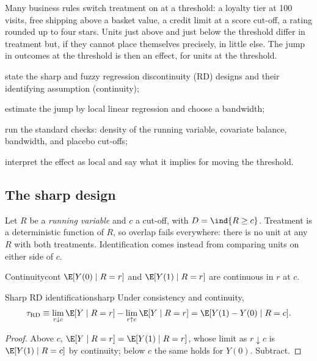 \documentclass[11pt]{article}
\begin{document}

\begin{decision}
Many business rules switch treatment on at a threshold: a loyalty tier at 100 visits, free shipping above a basket value, a
credit limit at a score cut-off, a rating rounded up to four stars. Units just above and just below the threshold differ in
treatment but, if they cannot place themselves precisely, in little else. The jump in outcomes at the threshold is then an
effect, for units at the threshold.
\end{decision}

\begin{goals}
  \item state the sharp and fuzzy regression discontinuity (RD) designs and their identifying assumption (continuity);
  \item estimate the jump by local linear regression and choose a bandwidth;
  \item run the standard checks: density of the running variable, covariate balance, bandwidth, and placebo cut-offs;
  \item interpret the effect as local and say what it implies for moving the threshold.
\end{goals}

\sectionone

\subsection{The sharp design}

Let $R$ be a \emph{running variable} and $c$ a cut-off, with $D = \ind{R \ge c}$. Treatment is a deterministic function of $R$, so
overlap fails everywhere: there is no unit at any $R$ with both treatments. Identification comes instead from comparing units on
either side of $c$.

\begin{assum}{Continuity}{cont}
$\E[Y(0) \mid R = r]$ and $\E[Y(1) \mid R = r]$ are continuous in $r$ at $c$.
\end{assum}

\begin{prop}{Sharp RD identification}{sharp}
Under consistency and continuity,
\[
  \tau_{\text{RD}} \equiv \lim_{r \downarrow c}\E[Y \mid R = r] - \lim_{r \uparrow c}\E[Y \mid R = r] = \E[Y(1) - Y(0) \mid R = c].
\]
\end{prop}
\begin{proof}
Above $c$, $\E[Y \mid R = r] = \E[Y(1) \mid R = r]$, whose limit as $r \downarrow c$ is $\E[Y(1) \mid R = c]$ by continuity; below $c$ the same
holds for $Y(0)$. Subtract.
\end{proof}
\end{document}
